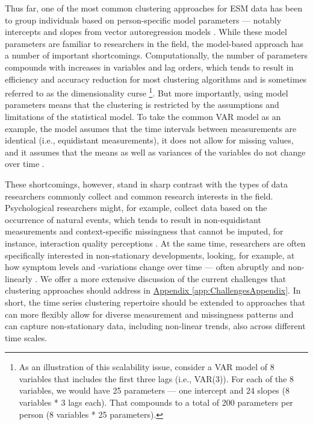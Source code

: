 \documentclass[man, 12pt, a4paper, mask, floatsintext]{apa7}
\theoremstyle{break}
\theoremstyle{plain}
\newcommand{\appref}[2][]{\hyperref[#2]{Appendix \ref*{#2}#1}}
\begin{document}
Thus far, one of the most common clustering approaches for ESM data has been to group individuals based on person-specific model parameters --- notably intercepts and slopes from vector autoregression models \citep[VAR; e.g.,][]{ariens2020}. While these model parameters are familiar to researchers in the field, the model-based approach has a number of important shortcomings. Computationally, the number of parameters compounds with increases in variables and lag orders, which tends to result in efficiency and accuracy reduction for most clustering algorithms and is sometimes referred to as the dimensionality curse \citep{altman2018}\footnote{As an illustration of this scalability issue, consider a VAR model of 8 variables that includes the first three lags (i.e., VAR(3)). For each of the 8 variables, we would have 25 parameters --- one intercept and 24 slopes (8 variables * 3 lags each). That compounds to a total of 200 parameters per person (8 variables * 25 parameters).}. But more importantly, using model parameters means that the clustering is restricted by the assumptions and limitations of the statistical model. To take the common VAR model as an example, the model assumes that the time intervals between measurements are identical (i.e., equidistant measurements), it does not allow for missing values, and it assumes that the means as well as variances of the variables do not change over time \citep[i.e., stationarity assumption;][]{lutkepohl2005}. 

These shortcomings, however, stand in sharp contrast with the types of data researchers commonly collect and common research interests in the field. Psychological researchers might, for example, collect data based on the occurrence of natural events, which tends to result in non-equidistant measurements \citep[e.g.,][]{myin-germeys2018, hamaker2017} and context-specific missingness that cannot be imputed, for instance, interaction quality perceptions \citep[e.g.,][]{kivela2022, lavori2008}. At the same time, researchers are often specifically interested in non-stationary developments, looking, for example, at how symptom levels and -variations change over time --- often abruptly and non-linearly \citep[][]{bringmann2018b, helmich2020a}. We offer a more extensive discussion of the current challenges that clustering approaches should address in \appref{app:ChallengesAppendix}. In short, the time series clustering repertoire should be extended to approaches that can more flexibly allow for diverse measurement and missingness patterns and can capture non-stationary data, including non-linear trends, also across different time scales.
\end{document}
